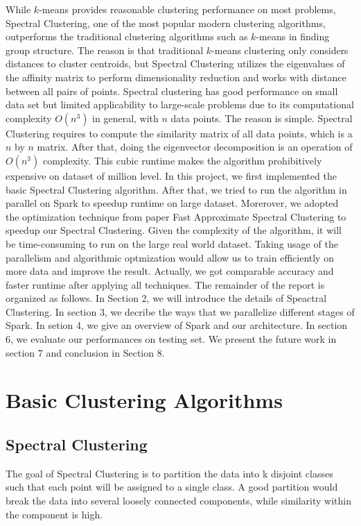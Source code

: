 \documentclass{acm_proc_article-sp}
\begin{document}
While $k$-means provides reasonable clustering performance on most problems, 
Spectral Clustering, one of the most popular modern clustering algorithms, outperforms the traditional clustering algorithms such as $k$-means in finding group structure. The reason is that traditional $k$-means clustering only considers distances to cluster centroids, but Spectral Clustering utilizes the eigenvalues of the affinity matrix to perform dimensionality reduction and works with distance between all pairs of points. Spectral clustering has good performance on small data set but limited applicability to large-scale problems due to its computational complexity $O(n^3)$ in general, with $n$ data points. The reason is simple. Spectral Clustering requires to compute the similarity matrix of all data points, which is a $n$ by $n$ matrix. After that, doing the eigenvector decomposition is an operation of 
$O(n^3)$ complexity. This cubic runtime makes the algorithm prohibitively expensive on dataset of million level. In this project, we first implemented the basic Spectral Clustering algorithm. After that, we tried to run the algorithm in parallel on Spark to speedup runtime on large dataset. Morerover, we adopted the optimization technique from paper Fast Approximate Spectral Clustering \cite{yan2009fast} to speedup our Spectral Clustering. Given the complexity of the algorithm, it will be time-consuming to run on the large real world dataset. Taking usage of the parallelism and algorithmic optmization would allow us to train efficiently on more data and improve the result. Actually, we got comparable accuracy and faster runtime after applying all techniques. The remainder of the report is organized as follows. In Section 2, we will introduce the details of Speactral Clustering. In section 3, we decribe the ways that we parallelize different stages of Spark. In setion 4, we give an overview of Spark and our architecture. In section 6,  we evaluate our performances on testing set. We present the future work in section 7 and conclusion in Section 8.

\section{Basic Clustering Algorithms}
\subsection{Spectral Clustering}
The goal of Spectral Clustering is to partition the data into k disjoint classes such that each point will be assigned to a single class. A good partition would break the data into several loosely connected components, while similarity within the component is high.
\end{document}
